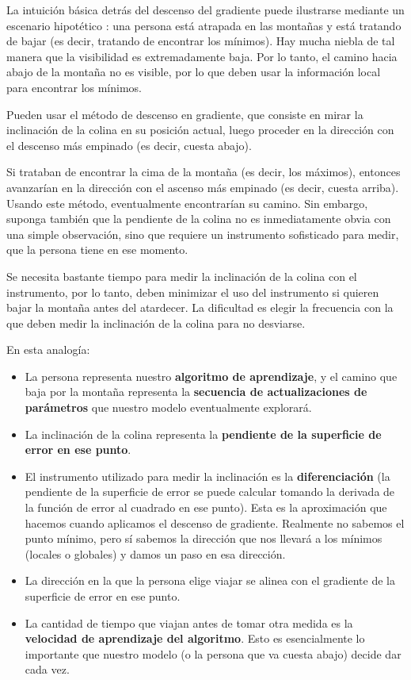 \documentclass[a4paper,12pt]{article}
\begin{document}
La intuición básica detrás del descenso del gradiente puede ilustrarse mediante un escenario hipotético \citep{gdanalogy}: una persona está atrapada en las montañas y está tratando de bajar (es decir, tratando de encontrar los mínimos). Hay mucha niebla de tal manera que la visibilidad es extremadamente baja. Por lo tanto, el camino hacia abajo de la montaña no es visible, por lo que deben usar la información local para encontrar los mínimos.

Pueden usar el método de descenso en gradiente, que consiste en mirar la inclinación de la colina en su posición actual, luego proceder en la dirección con el descenso más empinado (es decir, cuesta abajo).

\clearpage

Si trataban de encontrar la cima de la montaña (es decir, los máximos), entonces avanzarían en la dirección con el ascenso más empinado (es decir, cuesta arriba). Usando este método, eventualmente encontrarían su camino. Sin embargo, suponga también que la pendiente de la colina no es inmediatamente obvia con una simple observación, sino que requiere un instrumento sofisticado para medir, que la persona tiene en ese momento.

Se necesita bastante tiempo para medir la inclinación de la colina con el instrumento, por lo tanto, deben minimizar el uso del instrumento si quieren bajar la montaña antes del atardecer.
La dificultad es elegir la frecuencia con la que deben medir la inclinación de la colina para no desviarse.

En esta analogía:
\begin{itemize}[noitemsep, topsep=2pt]
	\item La persona representa nuestro \textbf{algoritmo de aprendizaje}, y el camino que baja por la montaña representa la \textbf{secuencia de actualizaciones de parámetros} que nuestro modelo eventualmente explorará.
	\item La inclinación de la colina representa la \textbf{pendiente de la superficie de error en ese punto}.
	\item El instrumento utilizado para medir la inclinación es la \textbf{diferenciación} (la pendiente de la superficie de error se puede calcular tomando la derivada de la función de error al cuadrado en ese punto). Esta es la aproximación que hacemos cuando aplicamos el descenso de gradiente. Realmente no sabemos el punto mínimo, pero sí sabemos la dirección que nos llevará a los mínimos (locales o globales) y damos un paso en esa dirección.
	\item La dirección en la que la persona elige viajar se alinea con el gradiente de la superficie de error en ese punto.
	\item La cantidad de tiempo que viajan antes de tomar otra medida es la \textbf{velocidad de aprendizaje del algoritmo}. Esto es esencialmente lo importante que nuestro modelo (o la persona que va cuesta abajo) decide dar cada vez.
\end{itemize}
\end{document}
